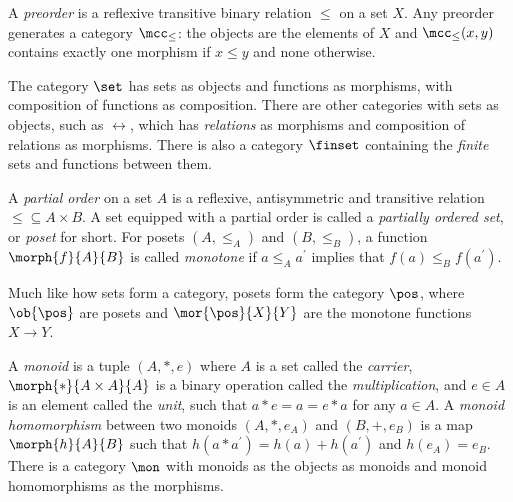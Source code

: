 \begin{example}[Preorder]
    A \emph{preorder} is a reflexive transitive binary relation \(\leq\) on a
    set \(X\).
    Any preorder generates a category \(\mcc_\leq\): the objects are the
    elements of \(X\) and \(\mcc_\leq(x, y)\) contains exactly one morphism if
    \(x \leq y\) and none otherwise.
\end{example}

\begin{example}[Sets]
    The category \(\set\) has sets as objects and functions as morphisms, with
    composition of functions as composition.
    There are other categories with sets as objects, such as \(\rel\), which has
    \emph{relations} as morphisms and composition of relations as morphisms.
    There is also a category \(\finset\) containing the \emph{finite} sets
    and functions between them.
\end{example}

\begin{example}[Posets]
    A \emph{partial order} on a set \(A\) is a reflexive, antisymmetric and
    transitive relation \({\leq} \subseteq A \times B\).
    A set equipped with a partial order is called a
    \emph{partially ordered set}, or \emph{poset} for short.
    For posets \((A,{\leq_A})\) and \((B,{\leq_B})\), a function
    \(\morph{f}{A}{B}\) is called \emph{monotone} if \(a \leq_A a^\prime\)
    implies that \(f(a) \leq_B f(a^\prime)\).

    Much like how sets form a category, posets form the category \(\pos\), where
    \(\ob{\pos}\) are posets and \(\mor{\pos}{X}{Y}\) are the monotone functions
    \(X \to Y\).
\end{example}

\begin{example}[Monoids]\label{ex:monoid}
    A \emph{monoid} is a tuple \((A, *, e)\) where \(A\) is a set called
    the \emph{carrier}, \(\morph{*}{A \times A}{A}\) is a binary operation
    called the \emph{multiplication}, and \(e \in A\) is an element called
    the \emph{unit}, such that \(a * e = a = e * a\) for any
    \(a \in A\).
    A \emph{monoid homomorphism} between two monoids \((A, *, e_A)\) and
    \((B, +, e_B)\) is a map \(\morph{h}{A}{B}\) such that
    \(h(a * a^\prime) = h(a) + h(a^\prime)\) and \(h(e_A) = e_B\).
    There is a category \(\mon\) with monoids as the objects as monoids and
    monoid homomorphisms as the morphisms.
\end{example}

